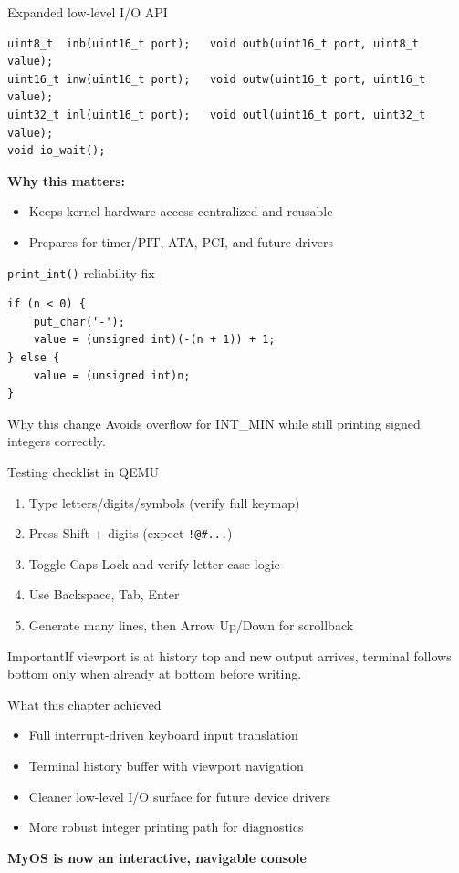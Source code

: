 \documentclass[aspectratio=169]{beamer}
\newcommand{\concept}[2]{%
  \begin{block}{#1}\smallskip #2\smallskip\end{block}\vspace{5pt}}
\newcommand{\warn}[1]{%
  \begin{alertblock}{Important}\smallskip #1\smallskip\end{alertblock}\vspace{5pt}}
\begin{document}
\begin{frame}[fragile]{Expanded low-level I/O API}
  \begin{lstlisting}[style=clang]
uint8_t  inb(uint16_t port);   void outb(uint16_t port, uint8_t value);
uint16_t inw(uint16_t port);   void outw(uint16_t port, uint16_t value);
uint32_t inl(uint16_t port);   void outl(uint16_t port, uint32_t value);
void io_wait();
  \end{lstlisting}
  \textbf{Why this matters:}
  \begin{itemize}
    \item Keeps kernel hardware access centralized and reusable
    \item Prepares for timer/PIT, ATA, PCI, and future drivers
  \end{itemize}
\end{frame}

\begin{frame}[fragile]{\texttt{print\_int()} reliability fix}
  \begin{lstlisting}[style=clang]
if (n < 0) {
    put_char('-');
    value = (unsigned int)(-(n + 1)) + 1;
} else {
    value = (unsigned int)n;
}
  \end{lstlisting}
  \concept{Why this change}{
    Avoids overflow for INT\_MIN while still printing signed integers correctly.
  }
\end{frame}

\begin{frame}{Testing checklist in QEMU}
  \begin{enumerate}
    \item Type letters/digits/symbols (verify full keymap)
    \item Press Shift + digits (expect \texttt{!@\#...})
    \item Toggle Caps Lock and verify letter case logic
    \item Use Backspace, Tab, Enter
    \item Generate many lines, then Arrow Up/Down for scrollback
  \end{enumerate}
  \warn{If viewport is at history top and new output arrives, terminal follows bottom only when already at bottom before writing.}
\end{frame}

\begin{frame}{What this chapter achieved}
  \begin{itemize}
    \item Full interrupt-driven keyboard input translation
    \item Terminal history buffer with viewport navigation
    \item Cleaner low-level I/O surface for future device drivers
    \item More robust integer printing path for diagnostics
  \end{itemize}
  \vspace{8pt}
  \begin{center}
    \Large \textbf{MyOS is now an interactive, navigable console}
  \end{center}
\end{frame}
\end{document}
